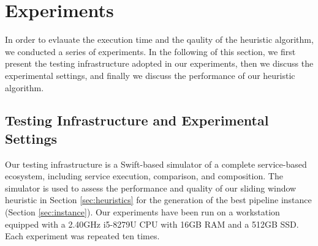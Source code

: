 \section{Experiments}\label{sec:experiment}


In order to evlauate the execution time and the qaulity of the heuristic algorithm, we conducted a series of experiments.
In the following of this section, we first present the testing infrastructure adopted in our experiments,
then we discuss the experimental settings, and
finally we discuss the performance of our heuristic algorithm.

\subsection{Testing Infrastructure and Experimental Settings}
Our testing infrastructure is a Swift-based simulator of a complete service-based ecosystem, including service execution, comparison, and composition.
The simulator is used to assess the performance and quality of our sliding window heuristic in Section \ref{sec:heuristics} for the generation of the best pipeline instance (Section \ref{sec:instance}).
Our experiments have been run on a workstation equipped with a 2.40GHz i5-8279U CPU with 16GB RAM and a 512GB SSD.
Each experiment was repeated ten times.

